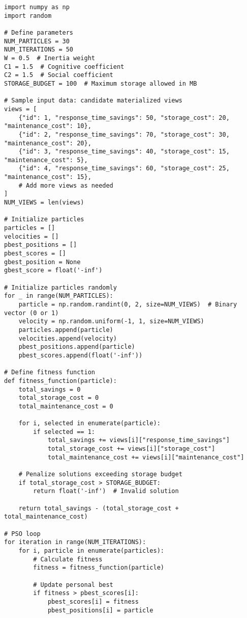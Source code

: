 \begin{verbatim}
import numpy as np
import random

# Define parameters
NUM_PARTICLES = 30
NUM_ITERATIONS = 50
W = 0.5  # Inertia weight
C1 = 1.5  # Cognitive coefficient
C2 = 1.5  # Social coefficient
STORAGE_BUDGET = 100  # Maximum storage allowed in MB

# Sample input data: candidate materialized views
views = [
    {"id": 1, "response_time_savings": 50, "storage_cost": 20, "maintenance_cost": 10},
    {"id": 2, "response_time_savings": 70, "storage_cost": 30, "maintenance_cost": 20},
    {"id": 3, "response_time_savings": 40, "storage_cost": 15, "maintenance_cost": 5},
    {"id": 4, "response_time_savings": 60, "storage_cost": 25, "maintenance_cost": 15},
    # Add more views as needed
]
NUM_VIEWS = len(views)

# Initialize particles
particles = []
velocities = []
pbest_positions = []
pbest_scores = []
gbest_position = None
gbest_score = float('-inf')

# Initialize particles randomly
for _ in range(NUM_PARTICLES):
    particle = np.random.randint(0, 2, size=NUM_VIEWS)  # Binary vector (0 or 1)
    velocity = np.random.uniform(-1, 1, size=NUM_VIEWS)
    particles.append(particle)
    velocities.append(velocity)
    pbest_positions.append(particle)
    pbest_scores.append(float('-inf'))

# Define fitness function
def fitness_function(particle):
    total_savings = 0
    total_storage_cost = 0
    total_maintenance_cost = 0

    for i, selected in enumerate(particle):
        if selected == 1:
            total_savings += views[i]["response_time_savings"]
            total_storage_cost += views[i]["storage_cost"]
            total_maintenance_cost += views[i]["maintenance_cost"]

    # Penalize solutions exceeding storage budget
    if total_storage_cost > STORAGE_BUDGET:
        return float('-inf')  # Invalid solution

    return total_savings - (total_storage_cost + total_maintenance_cost)

# PSO loop
for iteration in range(NUM_ITERATIONS):
    for i, particle in enumerate(particles):
        # Calculate fitness
        fitness = fitness_function(particle)

        # Update personal best
        if fitness > pbest_scores[i]:
            pbest_scores[i] = fitness
            pbest_positions[i] = particle


\end{verbatim}

